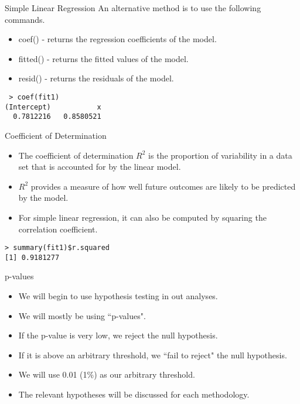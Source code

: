 \documentclass[pdf,default,slideColor,colorBG]{prosper}
\begin{document}
\begin{slide}{Simple Linear Regression}
An alternative method is to use the following commands.
\begin{itemize}
\item coef() - returns the regression coefficients of the model.
\item fitted() - returns the fitted values of the model.
\item resid() - returns the residuals of the model.


\end{itemize}
 \begin{verbatim}
 > coef(fit1)
(Intercept)           x
  0.7812216   0.8580521
\end{verbatim}


\end{slide}


\begin{slide}{Coefficient of Determination}
\begin{itemize}
\item The coefficient of determination $R^2$ is  the proportion of variability in a data set
that is accounted for by the linear model.
\item $R^2$ provides a measure of how well future outcomes are likely to be predicted by the model.
\item For simple linear regression, it can also be computed by squaring the correlation coefficient.
\end{itemize}

\begin{verbatim}
> summary(fit1)$r.squared
[1] 0.9181277
\end{verbatim}


\end{slide}


\begin{slide}{p-values}
\begin{itemize}
\item
We will begin to use hypothesis testing in out analyses.
\item We will mostly be using ``p-values".
\item If the p-value is very low, we reject the null hypothesis.
\item If it is above an arbitrary threshold, we ``fail to reject" the null hypothesis.
\item We will use 0.01 (1\%) as our arbitrary threshold.
\item The relevant hypotheses will be discussed for each methodology.
\end{itemize}
\end{slide}
\end{document}
